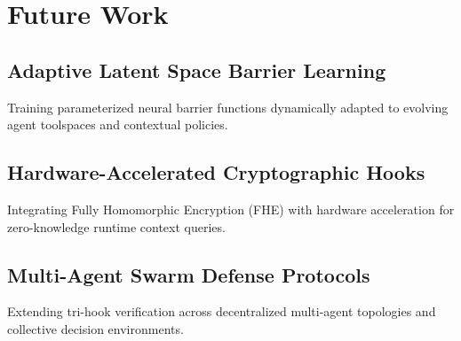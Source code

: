 \chapter{Future Work}
\label{ch:future_work}

\section{Adaptive Latent Space Barrier Learning}
Training parameterized neural barrier functions dynamically adapted to evolving agent toolspaces and contextual policies.

\section{Hardware-Accelerated Cryptographic Hooks}
Integrating Fully Homomorphic Encryption (FHE) with hardware acceleration for zero-knowledge runtime context queries.

\section{Multi-Agent Swarm Defense Protocols}
Extending tri-hook verification across decentralized multi-agent topologies and collective decision environments.
